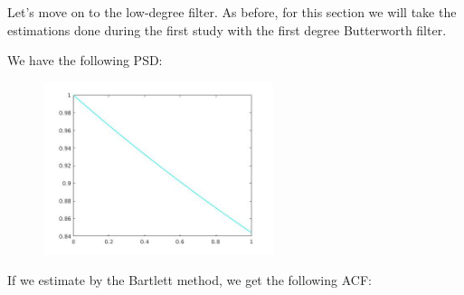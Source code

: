 \documentclass[a4paper,11pt]{article}
\begin{document}
Let's move on to the low-degree filter. As before, for this section we will take the estimations done during the first study
with the first degree Butterworth filter.

We have the following PSD:

\begin{figure}[!hp]
    \begin{center}
      \includegraphics[width=0.6\textwidth]{images/lab2_54.jpg}
    \end{center}
\end{figure}

If we estimate by the Bartlett method, we get the following ACF:
\end{document}
